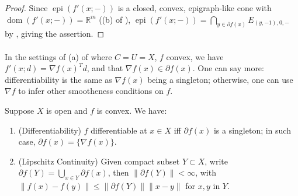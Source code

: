 \begin{proof}
	Since $\operatorname{epi}(f'(x;-))$ is a closed, convex, epigraph-like cone with $\operatorname{dom}(f'(x;-))=\mathbb{R}^m$ ((b) of ), $\operatorname{epi}(f'(x;-))=\bigcap_{y\in \partial f(x)}E_{(y,-1),0,-}$ by , giving the assertion.
\end{proof}

\paragraph{}In the settings of (a) of  where $C=U=X$, $f$ convex, we have $f'(x;d)= \nabla f(x)^Td$, and that $\nabla f(x)\in \partial f(x)$. One can say more: differentiability is the same as $\nabla f(x)$ being a singleton; otherwise, one can use $\nabla f$ to infer other smootheness conditions on $f$.

\begin{prop}\label{prop:022-smoothness-and-other-stuffs}Suppose $X$ is open and $f$ is convex. We have:
	\begin{enumerate}[label=(\alph*)]
		\item (Differentiability) $f$ differentiable at $x\in X$ iff $\partial f(x)$ is a singleton; in such case, $\partial f(x)=\{\nabla f(x)\}$.
		\item (Lipschitz Continuity) Given compact subset $Y\subset X$, write $\partial f(Y)=\bigcup_{x\in Y}\partial f(x)$, then $\|\partial f(Y)\|<\infty$, with $\|f(x)-f(y)\|\leq \|\partial f(Y)\|\|x-y\|$ for $x,y$ in $Y$.
	\end{enumerate}
\end{prop}


